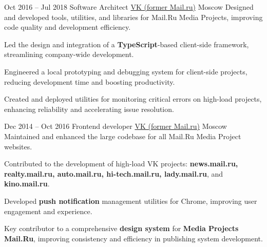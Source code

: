 \cventry
{Oct 2016 – Jul 2018}
{Software Architect}
{\href{https://vk.company}{VK ({former Mail.ru})}}
{Moscow}
{}
{Designed and developed tools, utilities, and libraries for Mail.Ru Media Projects, improving code quality and development efficiency.}

\cvlistitem
{Led the design and integration of a \textbf{TypeScript}-based client-side framework, streamlining company-wide development.}

\cvlistitem
{Engineered a local prototyping and debugging system for client-side projects, reducing development time and boosting productivity.}

\cvlistitem
{Created and deployed utilities for monitoring critical errors on high-load projects, enhancing reliability and accelerating issue resolution.}


\cventry
{Dec 2014 – Oct 2016}
{Frontend developer}
{\href{https://vk.company}{VK ({former Mail.ru})}}
{Moscow}
{}
{Maintained and enhanced the large codebase for all Mail.Ru Media Project websites.}

\cvlistitem
{Contributed to the development of high-load VK projects: \textbf{news.mail.ru, realty.mail.ru, auto.mail.ru, hi-tech.mail.ru, lady.mail.ru}, and \textbf{kino.mail.ru}.}

\cvlistitem
{Developed \textbf{push notification} management utilities for Chrome, improving user engagement and experience.}

\cvlistitem
{Key contributor to a comprehensive \textbf{design system} for \textbf{Media Projects Mail.Ru}, improving consistency and efficiency in publishing system development.}
